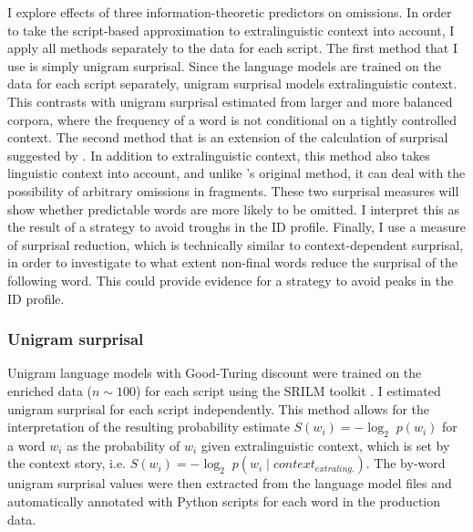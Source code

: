 \noindent I explore effects of three information-theoretic predictors on omissions. In order to take the script-based approximation to extralinguistic context into account, I apply all methods separately to the data for each script. The first method that I use is simply unigram surprisal. Since the language models are trained on the data for each script separately, unigram surprisal models extralinguistic context. This contrasts with unigram surprisal estimated from larger and more balanced corpora, where the frequency of a word is not conditional on a tightly controlled context. The second method that is an extension of the calculation of surprisal suggested by \citet{hale2001}. In addition to extralinguistic context, this method also takes linguistic context into account, and unlike \citeauthor{hale2001}'s original method, it can deal with the possibility of arbitrary omissions in fragments. These two surprisal measures will show whether predictable words are more likely to be omitted. I interpret this as the result of a strategy to avoid troughs in the ID profile. Finally, I use a measure of surprisal reduction, which is technically similar to context-dependent surprisal, in order to investigate to what extent non-final words reduce the surprisal of the following word. This could provide evidence for a strategy to avoid peaks in the ID profile.

\subsubsection{Unigram surprisal}

Unigram language models with Good-Turing discount were trained on the enriched data ($n \sim 100$) for each script using the SRILM toolkit \citep{stolcke2002}. I estimated unigram surprisal for each script independently. This method allows for the interpretation of the resulting probability estimate $S(w_i) = -\log_2\;p(w_i)$ for a word $w_i$ as the probability of $w_i$  given extralinguistic context, which is set by the context story, i.e. $S(w_i) = -\log_2\;p(w_i\mathbin{|} context_{extraling.})$. The by-word unigram surprisal values were then extracted from the language model files and automatically annotated with Python scripts for each word in the production data. 

